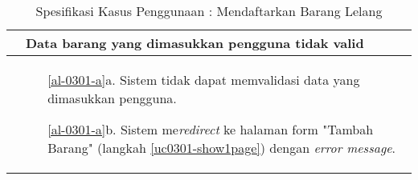 \begin{table}[H]
\begin{tabular}{|r|p{8cm}|}
		\multicolumn{1}{|l|}{}                                           & \textbf{Data barang yang dimasukkan pengguna tidak valid}
			\\ \hline
		\multicolumn{1}{|l|}{}                                           & 
			 \begin{itemize}
			 	\item[\ref{al-0301-a}a.] Sistem tidak dapat memvalidasi data yang dimasukkan pengguna.
			 	\item[\ref{al-0301-a}b.] Sistem me\textit{redirect} ke halaman form "Tambah Barang" (langkah \ref{uc0301-show1page}) dengan \textit{error message}.
			 \end{itemize}
		 \\ \hline
	\end{tabular}
	\caption{Spesifikasi Kasus Penggunaan : Mendaftarkan Barang Lelang}
	\label{uc03.01}
\end{table}